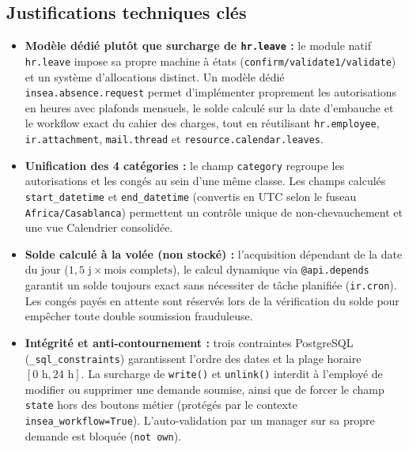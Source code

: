 \documentclass[11pt,a4paper]{article}
\begin{document}
\subsection{Justifications techniques clés}
\begin{itemize}[itemsep=3pt]
    \item \textbf{Modèle dédié plutôt que surcharge de \texttt{hr.leave} :} le module natif \texttt{hr.leave} impose sa propre machine à états (\texttt{confirm/validate1/validate}) et un système d'allocations distinct. Un modèle dédié \texttt{insea.absence.request} permet d'implémenter proprement les autorisations en heures avec plafonds mensuels, le solde calculé sur la date d'embauche et le workflow exact du cahier des charges, tout en réutilisant \texttt{hr.employee}, \texttt{ir.attachment}, \texttt{mail.thread} et \texttt{resource.calendar.leaves}.
    \item \textbf{Unification des 4 catégories :} le champ \texttt{category} regroupe les autorisations et les congés au sein d'une même classe. Les champs calculés \texttt{start\_datetime} et \texttt{end\_datetime} (convertis en UTC selon le fuseau \texttt{Africa/Casablanca}) permettent un contrôle unique de non-chevauchement et une vue Calendrier consolidée.
    \item \textbf{Solde calculé à la volée (non stocké) :} l'acquisition dépendant de la date du jour ($1{,}5\text{ j} \times \text{mois complets}$), le calcul dynamique via \texttt{@api.depends} garantit un solde toujours exact sans nécessiter de tâche planifiée (\texttt{ir.cron}). Les congés payés en attente sont réservés lors de la vérification du solde pour empêcher toute double soumission frauduleuse.
    \item \textbf{Intégrité et anti-contournement :} trois contraintes PostgreSQL (\texttt{\_sql\_constraints}) garantissent l'ordre des dates et la plage horaire $[0\text{ h}, 24\text{ h}]$. La surcharge de \texttt{write()} et \texttt{unlink()} interdit à l'employé de modifier ou supprimer une demande soumise, ainsi que de forcer le champ \texttt{state} hors des boutons métier (protégés par le contexte \texttt{insea\_workflow=True}). L'auto-validation par un manager sur sa propre demande est bloquée (\texttt{not own}).
\end{itemize}
\end{document}
